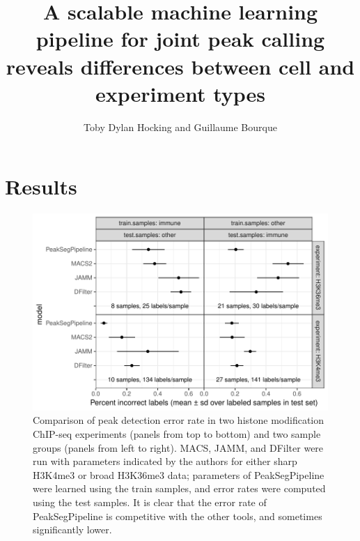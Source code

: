 \documentclass{article}
\begin{document}
\title{A scalable machine learning pipeline for joint peak calling
  reveals differences between cell and experiment types}
\author{Toby Dylan Hocking and Guillaume Bourque}
\maketitle

\section{Results}

\begin{figure}
  \centering
  \includegraphics[width=\textwidth]{figure-test-error.pdf}
  \vskip -0.5cm
  \caption{Comparison of peak detection error rate in two histone
    modification ChIP-seq experiments (panels from top to bottom) and
    two sample groups (panels from left to right). MACS, JAMM, and
    DFilter were run with parameters indicated by the authors for
    either sharp H3K4me3 or broad H3K36me3 data; parameters of
    PeakSegPipeline were learned using the train samples, and error
    rates were computed using the test samples. It is clear that the
    error rate of PeakSegPipeline is competitive with the other tools,
    and sometimes significantly lower.}
\end{figure}
\end{document}
